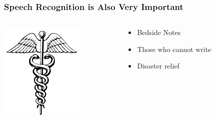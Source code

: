 \documentclass[pdflatex,compress]{beamer}
\begin{document}
\begin{frame}
  \frametitle{Speech Recognition is Also Very Important}
  \begin{columns}[onlytextwidth]
    \begin{column}{0.6\textwidth}
      \centering
      \includegraphics[scale=1.5]{caduceus.png}\\
    \end{column}
    \begin{column}{0.4\textwidth}
      \begin{itemize}
      \item Bedside Notes
      \item Those who cannot write
      \item Disaster relief
      \end{itemize}
    \end{column}
​    \end{columns}
\end{frame}

\end{document}

